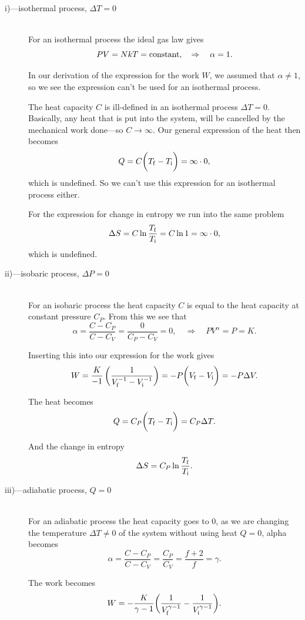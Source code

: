 \documentclass[a4paper, 11pt, titlepage, english]{article}
\begin{document}
\begin{description}
\item[i)---isothermal process, $\Delta T = 0$] $ $ \\ For an isothermal process the ideal gas law gives
$$PV = NkT = {\rm constant}, \quad \Rightarrow \quad \alpha = 1.$$

In our derivation of the expression for the work $W$, we assumed that $\alpha \neq 1$, so we see the expression can't be used for an isothermal process.

The heat capacity $C$ is ill-defined in an isothermal process $\Delta T = 0$. Basically, any heat that is put into the system, will be cancelled by the mechanical work done---so $C \rightarrow \infty$. Our general expression of the heat then becomes
$$Q = C\bigg(T_{\rm f} - T_{\rm i}\bigg) = \infty \cdot 0,$$
which is undefined. So we can't use this expression for an isothermal process either.

For the expression for change in entropy we run into the same problem
$$\Delta S = C \ln \frac{T_{\rm f}}{T_{\rm i}} = C \ln 1 = \infty \cdot 0, $$
which is undefined.

\item[ii)---isobaric process, $\Delta P = 0$] $ $ \\ For an isobaric process the heat capacity $C$ is equal to the heat capacity at constant pressure $C_P$. From this we see that
$$\alpha = \frac{C-C_P}{C-C_V} = \frac{0}{C_P - C_V} = 0, \quad \Rightarrow \quad PV^\alpha = P = K.$$

Inserting this into our expression for the work gives
$$W = \frac{K}{-1}\left(\frac{1}{V_{\rm f}^{-1} - V_{\rm i}^{-1}}\right) = -P\bigg(V_{\rm f} - V_{\rm i}\bigg) = -P\Delta V.$$

The heat becomes
$$Q = C_P\bigg(T_{\rm f} - T_{\rm i}\bigg) = C_P \Delta T. $$

And the change in entropy
$$ \Delta S = C_P\ln\frac{T_{\rm f}}{T_{\rm i}}. $$

\item[iii)---adiabatic process, $Q = 0$] $ $ \\
For an adiabatic process the heat capacity goes to 0, as we are changing the temperature $\Delta T \neq 0$ of the  system without using heat $Q=0$, alpha becomes
$$\alpha = \frac{C- C_P}{C-C_V} = \frac{C_P}{C_V} = \frac{f + 2}{f} = \gamma.$$

The work becomes
$$W = -\frac{K}{\gamma - 1}\bigg( \frac{1}{V_{\rm f}^{\gamma-1}} - \frac{1}{V_{\rm i}^{\gamma - 1}}\bigg).$$


\end{description}
\end{document}
